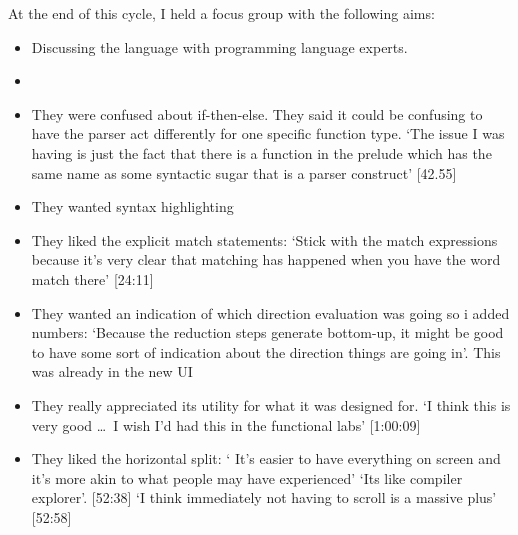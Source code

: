 At the end of this cycle, I held a focus group with the following aims:

\begin{itemize}
    \item Discussing the language with programming language experts.
    \item 
\end{itemize}

\begin{itemize}
    \item They were confused about if-then-else. They said it could be confusing to have the parser act differently for one specific function type. `The issue I was having is just the fact that there is a function in the prelude which has
    the same name as some syntactic sugar that is a parser construct' [42.55]
    \item They wanted syntax highlighting
    \item They liked the explicit match statements: `Stick with the match expressions because it's very clear that matching has happened when you have the word match there' [24:11]
    \item They wanted an indication of which direction evaluation was going so i added numbers: `Because the reduction steps generate bottom-up,
    it might be good to have some sort of indication about the direction things are going in'. This was already in the new UI
    \item They really appreciated its utility for what it was designed for. `I think this is very good \ldots\ I wish I'd had this in the functional labs' [1:00:09]
\end{itemize}

\begin{itemize}
    \item They liked the horizontal split: ` It's easier to have everything on screen and it's more akin to what people may have experienced' `Its like compiler explorer'. [52:38] `I think immediately not having to scroll is a massive plus' [52:58]
\end{itemize}